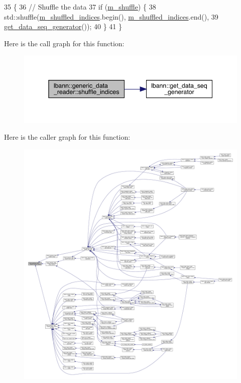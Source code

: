 \begin{DoxyCode}
35                                           \{
36   \textcolor{comment}{// Shuffle the data}
37   \textcolor{keywordflow}{if} (\hyperlink{classlbann_1_1generic__data__reader_a8039ed9c12a5847f0dcf7dd54b8d2f5b}{m\_shuffle}) \{
38     std::shuffle(\hyperlink{classlbann_1_1generic__data__reader_aaab6aeff67ffff1c689336851fec2c57}{m\_shuffled\_indices}.begin(), 
      \hyperlink{classlbann_1_1generic__data__reader_aaab6aeff67ffff1c689336851fec2c57}{m\_shuffled\_indices}.end(),
39                  \hyperlink{namespacelbann_aba9d11cb3a739cd84e7234ceeb32d098}{get\_data\_seq\_generator}());
40   \}
41 \}
\end{DoxyCode}
Here is the call graph for this function\+:\nopagebreak
\begin{figure}[H]
\begin{center}
\leavevmode
\includegraphics[width=345pt]{classlbann_1_1generic__data__reader_af1aaa4d1a693974c1b1f1318b6ed60b8_cgraph}
\end{center}
\end{figure}
Here is the caller graph for this function\+:\nopagebreak
\begin{figure}[H]
\begin{center}
\leavevmode
\includegraphics[width=350pt]{classlbann_1_1generic__data__reader_af1aaa4d1a693974c1b1f1318b6ed60b8_icgraph}
\end{center}
\end{figure}
